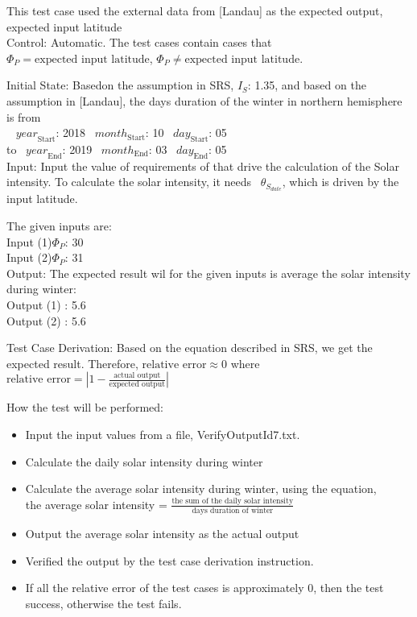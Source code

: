 \documentclass[12pt, titlepage]{article}
\begin{document}
\begin{enumerate}
This test case used the external data from [Landau]\cite{Charles2001}
as the expected output, expected input latitude\\

Control: Automatic. The test cases contain cases that $\Phi_P = \text{expected
input latitude}$, $\Phi_P \ne \text{expected input latitude}$. 

Initial State:
Basedon the assumption in SRS\cite{YS2019}, $I_{S}$: 1.35, and based on the
assumption in [Landau]\cite{Charles2001}, the days duration of the winter in
northern hemisphere is from\\
~ $\mathit{year}_\text{Start}$: 2018
~$\mathit{month}_\text{Start}$: 10 
~$\mathit{day}_\text{Start}$: 05 \\
 to
~$\mathit{year}_\text{End}$: 2019 
~$\mathit{month}_\text{End}$: 03
~$\mathit{day}_\text{End}$: 05\\

Input: Input the value of requirements of
\progname that drive the calculation of the Solar intensity. To calculate the
solar intensity, it needs ~$\theta_{S_{date}}$, which is driven by the input
latitude.

The given inputs are:\\ 
Input (1)$\Phi_P$: 30 \\ 
Input (2)$\Phi_P$: 31\\

Output: The expected result wil for the given inputs is average the solar
intensity during winter:\\ 
Output (1) : 5.6\\ 
Output (2) : 5.6\\


Test Case Derivation: Based on the equation described in SRS\cite{YS2019}, we
get the expected result. Therefore, $\text{relative error} \approx 0$ where
$\text{relative error} = | 1 - \frac{\text{actual output}}{ \text{expected
output}} |$


How the test will be performed: 

\begin{itemize} 
\item Input the input values from a file, VerifyOutputId7.txt. 
\item Calculate the daily solar intensity during winter 
\item Calculate the average solar intensity during winter, using the equation,\\the average solar intensity = $\frac{\text{the sum of the daily solar
intensity}}{\text{days duration of winter}}$
\item Output the average solar intensity as the actual output
\item Verified the output by the test case derivation instruction. 
\item If all the relative error of the test cases is approximately 0, then the
test success, otherwise the test fails.
\end{itemize}
\end{enumerate}
\end{document}

